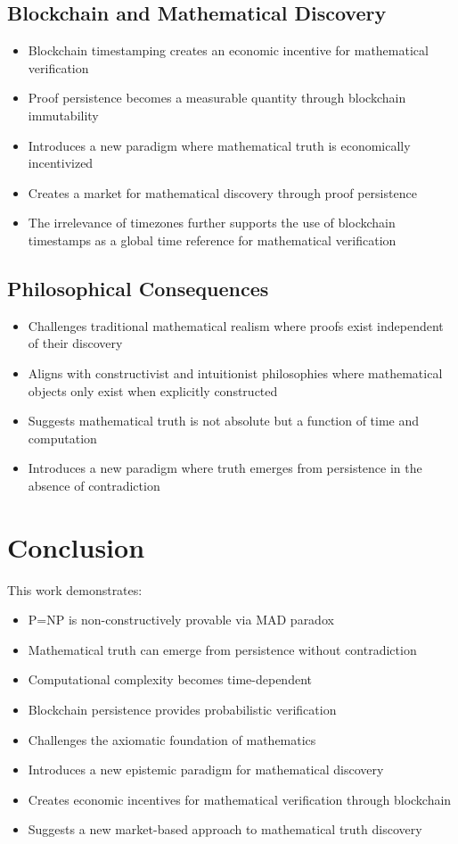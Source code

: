 \documentclass{article}
\begin{document}
\subsection{Blockchain and Mathematical Discovery}
\begin{itemize}
    \item Blockchain timestamping creates an economic incentive for mathematical verification
    \item Proof persistence becomes a measurable quantity through blockchain immutability
    \item Introduces a new paradigm where mathematical truth is economically incentivized
    \item Creates a market for mathematical discovery through proof persistence
    \item The irrelevance of timezones \cite{Houk2024Timezones} further supports the use of blockchain timestamps as a global time reference for mathematical verification
\end{itemize}

\subsection{Philosophical Consequences}
\begin{itemize}
    \item Challenges traditional mathematical realism where proofs exist independent of their discovery
    \item Aligns with constructivist and intuitionist philosophies where mathematical objects only exist when explicitly constructed
    \item Suggests mathematical truth is not absolute but a function of time and computation
    \item Introduces a new paradigm where truth emerges from persistence in the absence of contradiction
\end{itemize}

\section{Conclusion}
This work demonstrates:
\begin{itemize}
    \item P=NP is non-constructively provable via MAD paradox
    \item Mathematical truth can emerge from persistence without contradiction
    \item Computational complexity becomes time-dependent
    \item Blockchain persistence provides probabilistic verification
    \item Challenges the axiomatic foundation of mathematics
    \item Introduces a new epistemic paradigm for mathematical discovery
    \item Creates economic incentives for mathematical verification through blockchain
    \item Suggests a new market-based approach to mathematical truth discovery
\end{itemize}
\end{document}

